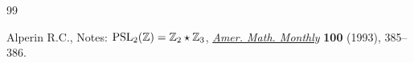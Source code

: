 \begin{thebibliography}{99}

\footnotesize\itemsep=0pt
Alperin R.C.,
Notes: ${\rm  {PSL}}_2(\mathbb Z)= \mathbb Z_2 \star \mathbb Z_3$,
\href{http://dx.doi.org/10.2307/2324963}{{\it Amer. Math. Monthly}} {\bf 100} (1993), 385--386.
\end{thebibliography}
